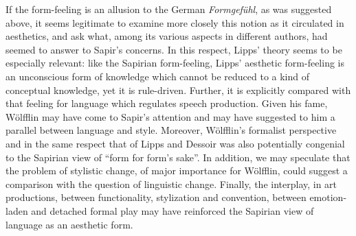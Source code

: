 \documentclass[output=paper]{langscibook}
\begin{document}
\newpage 
If the form-feeling is an allusion to the German \emph{Formgefühl}, as was suggested above, it seems legitimate to examine more closely this notion as it circulated in aesthetics, and ask what, among its various aspects in different authors, had seemed to answer to Sapir's concerns. In this respect, Lipps' theory seems to be especially relevant: like the Sapirian form-feeling, Lipps' aesthetic form-feeling is an unconscious form of knowledge which cannot be reduced to a kind of conceptual knowledge, yet it is rule-driven. Further, it is explicitly compared with that feeling for language which regulates speech production. Given his fame, Wölfflin may have come to Sapir's attention and may have suggested to him a parallel between language and style. Moreover, Wölfflin's formalist perspective and in the same respect that of Lipps and Dessoir was also potentially congenial to the Sapirian view of ``form for form’s sake''. In addition, we may speculate that the problem of stylistic change, of major importance for Wölfflin, could suggest a comparison with the question of linguistic change. Finally, the interplay, in art productions, between functionality, stylization and convention, between emotion-laden and detached formal play may have reinforced the Sapirian view of language as an aesthetic form.

\sloppy
\printbibliography[heading=subbibliography,notkeyword=this]
\end{document}
